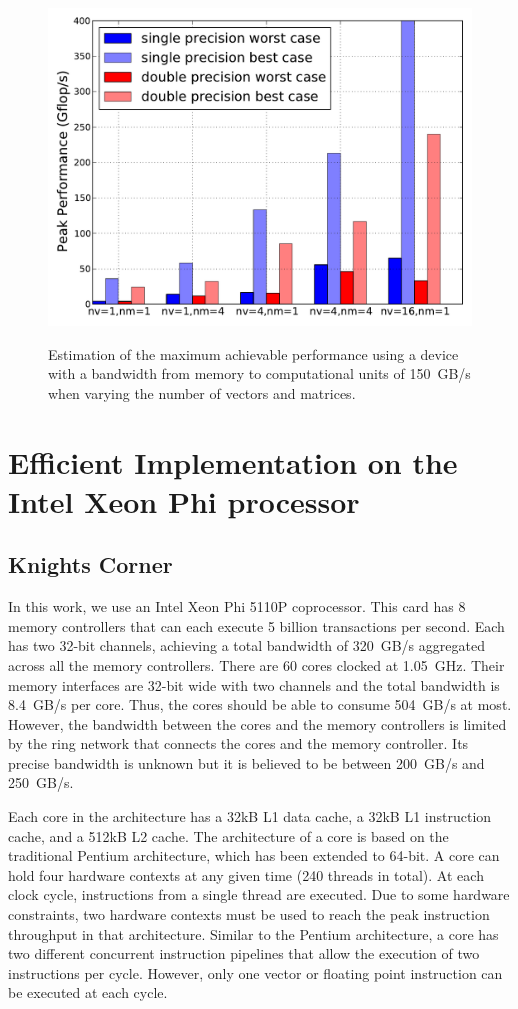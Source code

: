 \documentclass[10pt,conference,compsocconf]{IEEEtran}
\begin{document}
\begin{figure}
  \centering 
  \includegraphics[width=.9\linewidth]{figures/gflops_peak.pdf}\label{fig:gflops-peak-perf}
  \caption{Estimation of the maximum achievable performance using a
    device with a bandwidth from memory to computational units of 150~GB/s when
    varying the number of vectors and matrices.}
  \label{fig:perf_predict}
\end{figure}

\section{Efficient Implementation on the Intel Xeon Phi processor}
\label{sec:impl}

\subsection{Knights Corner}

In this work, we use an Intel Xeon Phi 5110P coprocessor. This card
has 8 memory controllers that can each execute 5 billion
transactions per second. Each has two 32-bit channels, achieving a total
bandwidth of 320~GB/s aggregated across all the memory
controllers. There are 60 cores clocked at 1.05~GHz. Their memory
interfaces are 32-bit wide with two channels and the total bandwidth
is 8.4~GB/s per core. Thus, the cores should be able to consume 504~GB/s
at most. However, the bandwidth between the cores and the memory
controllers is limited by the ring network that connects the cores and
the memory controller. Its precise bandwidth is unknown but it is
believed to be between 200~GB/s and 250~GB/s.

Each core in the architecture has a 32kB L1 data cache, a 32kB L1
instruction cache, and a 512kB L2 cache. The architecture of a core is
based on the traditional Pentium architecture, which has been extended to
64-bit. A core can hold four hardware contexts at any given time (240 threads in total). At each
clock cycle, instructions from a single thread are executed. Due to
some hardware constraints, two hardware contexts must be used to reach
the peak instruction throughput in that architecture. Similar to the
Pentium architecture, a core has two different concurrent instruction
pipelines that allow the execution of two instructions per
cycle. However, only one vector or floating point instruction can be
executed at each cycle.
\end{document}
